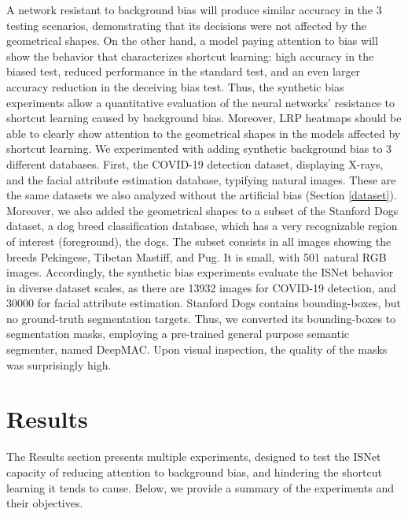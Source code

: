 \documentclass[fleqn,10pt]{wlscirep}
\begin{document}
A network resistant to background bias will produce similar accuracy in the 3 testing scenarios, demonstrating that its decisions were not affected by the geometrical shapes. On the other hand, a model paying attention to bias will show the behavior that characterizes shortcut learning\cite{ShortcutLearning}: high accuracy in the biased test, reduced performance in the standard test, and an even larger accuracy reduction in the deceiving bias test. Thus, the synthetic bias experiments allow a quantitative evaluation of the neural networks' resistance to shortcut learning caused by background bias. Moreover, LRP heatmaps should be able to clearly show attention to the geometrical shapes in the models affected by shortcut learning. We experimented with adding synthetic background bias to 3 different databases. First, the COVID-19 detection dataset, displaying X-rays, and the facial attribute estimation database, typifying natural images. These are the same datasets we also analyzed without the artificial bias (Section \ref{dataset}). Moreover, we also added the geometrical shapes to a subset of the Stanford Dogs dataset\cite{StanfordDogs}, a dog breed classification database, which has a very recognizable region of interest (foreground), the dogs. The subset consists in all images showing the breeds Pekingese, Tibetan Mastiff, and Pug. It is small, with 501 natural RGB images. Accordingly, the synthetic bias experiments evaluate the ISNet behavior in diverse dataset scales, as there are 13932 images for COVID-19 detection, and 30000 for facial attribute estimation. Stanford Dogs contains bounding-boxes, but no ground-truth segmentation targets\cite{StanfordDogs}. Thus, we converted its bounding-boxes to segmentation masks, employing a pre-trained general purpose semantic segmenter, named DeepMAC\cite{deepMAC}. Upon visual inspection, the quality of the masks was surprisingly high.

\section{Results}
The Results section presents multiple experiments, designed to test the ISNet capacity of reducing attention to background bias, and hindering the shortcut learning it tends to cause. Below, we provide a summary of the experiments and their objectives.
\end{document}
